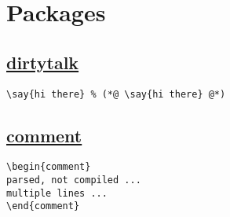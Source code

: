 \section{Packages}

\subsection*{\href{http://mirrors.ctan.org/macros/latex/contrib/dirtytalk/dirtytalk.pdf}{dirtytalk}}
\begin{minipage}{6.0cm}
\begin{lstlisting}
\say{hi there} % (*@ \say{hi there} @*)
\end{lstlisting}
\end{minipage} 

\subsection*{\href{http://mirrors.ctan.org/macros/latex/contrib/comment/comment.pdf}{comment}}
\begin{minipage}{4cm}
\begin{lstlisting}
\begin{comment} 
parsed, not compiled ...
multiple lines ...
\end{comment}
\end{lstlisting}
\end{minipage}

